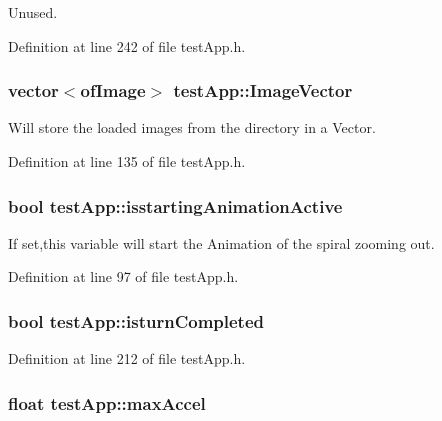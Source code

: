 Unused. 



Definition at line 242 of file test\-App.\-h.

\hypertarget{classtest_app_ad4de5d6e6e8f3b8bb7424e62792deb1f}{
\subsubsection[{Image\-Vector}]{\setlength{\rightskip}{0pt plus 5cm}vector$<$of\-Image$>$ test\-App\-::\-Image\-Vector}}\label{classtest_app_ad4de5d6e6e8f3b8bb7424e62792deb1f}


Will store the loaded images from the directory in a Vector. 



Definition at line 135 of file test\-App.\-h.

\hypertarget{classtest_app_ab8a277e1055730fb5d6786ce0c4804b2}{
\subsubsection[{isstarting\-Animation\-Active}]{\setlength{\rightskip}{0pt plus 5cm}bool test\-App\-::isstarting\-Animation\-Active}}\label{classtest_app_ab8a277e1055730fb5d6786ce0c4804b2}


If set,this variable will start the Animation of the spiral zooming out. 



Definition at line 97 of file test\-App.\-h.

\hypertarget{classtest_app_a42478a80a90ce9f663c04bcdaea5c5bd}{
\subsubsection[{isturn\-Completed}]{\setlength{\rightskip}{0pt plus 5cm}bool test\-App\-::isturn\-Completed}}\label{classtest_app_a42478a80a90ce9f663c04bcdaea5c5bd}


Definition at line 212 of file test\-App.\-h.

\hypertarget{classtest_app_a34e834a5e4d359700147a74eece8eed1}{
\subsubsection[{max\-Accel}]{\setlength{\rightskip}{0pt plus 5cm}float test\-App\-::max\-Accel}}\label{classtest_app_a34e834a5e4d359700147a74eece8eed1}


